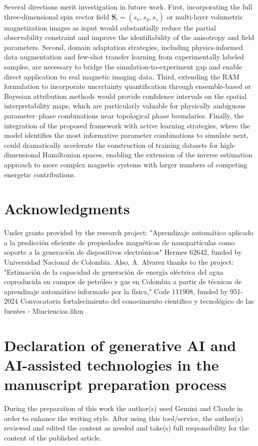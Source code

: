 \documentclass[final,5p,times,twocolumn]{elsarticle}
\begin{document}
Several directions merit investigation in future work. First,
incorporating the full three-dimensional spin vector field
$\mathbf{S}_i = (s_x, s_y, s_z)$ or multi-layer volumetric
magnetization images as input would substantially reduce the partial
observability constraint and improve the identifiability of the
anisotropy and field parameters. Second, domain adaptation strategies, including physics-informed data augmentation and few-shot transfer
learning from experimentally labeled samples, are necessary to
bridge the simulation-to-experiment gap and enable direct application
to real magnetic imaging data. Third, extending the RAM formulation to
incorporate uncertainty quantification through ensemble-based or
Bayesian attribution methods would provide confidence intervals on the
spatial interpretability maps, which are particularly valuable for
physically ambiguous parameter--phase combinations near topological
phase boundaries. Finally, the integration of the proposed framework
with active learning strategies, where the model identifies the
most informative parameter combinations to simulate next, could
dramatically accelerate the construction of training datasets for
high-dimensional Hamiltonian spaces, enabling the extension of the
inverse estimation approach to more complex magnetic systems with
larger numbers of competing energetic contributions.


\section*{Acknowledgments}
Under grants provided by the research project: "Aprendizaje automático aplicado a la predicción eficiente de propiedades magnéticas de nanopartículas como soporte a la generación de dispositivos electrónicos" Hermes 62642, funded by Universidad Nacional de Colombia. Also, A. Alvarez thanks to the project: "Estimación de la capacidad de generación de energía eléctrica del agua coproducida en campos de petróleo y gas en Colombia a partir de técnicas de aprendizaje automático informado por la física," Code 111908, funded by 951-2024 Convocatoria fortalecimiento del conocimiento científico y tecnológico de las fuentes - Minciencias.ñkm

\section*{Declaration of generative AI and AI-assisted technologies in the manuscript preparation process}

During the preparation of this work the author(s) used Gemini and Claude in order to enhance the writing style. After using this tool/service, the author(s) reviewed and edited the content as needed and take(s) full responsibility for the content of the published article.
\end{document}
